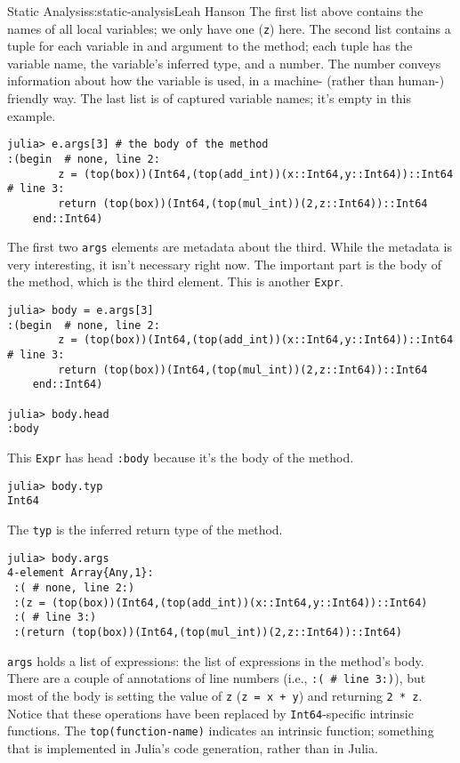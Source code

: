 \begin{aosachapter}{Static Analysis}{s:static-analysis}{Leah Hanson}
The first list above contains the names of all local variables; we only
have one (\texttt{z}) here. The second list contains a tuple for each
variable in and argument to the method; each tuple has the variable
name, the variable's inferred type, and a number. The number conveys
information about how the variable is used, in a machine- (rather than
human-) friendly way. The last list is of captured variable names; it's
empty in this example.

\begin{verbatim}
julia> e.args[3] # the body of the method
:(begin  # none, line 2:
        z = (top(box))(Int64,(top(add_int))(x::Int64,y::Int64))::Int64 # line 3:
        return (top(box))(Int64,(top(mul_int))(2,z::Int64))::Int64
    end::Int64)
\end{verbatim}

The first two \texttt{args} elements are metadata about the third. While
the metadata is very interesting, it isn't necessary right now. The
important part is the body of the method, which is the third element.
This is another \texttt{Expr}.

\begin{verbatim}
julia> body = e.args[3]
:(begin  # none, line 2:
        z = (top(box))(Int64,(top(add_int))(x::Int64,y::Int64))::Int64 # line 3:
        return (top(box))(Int64,(top(mul_int))(2,z::Int64))::Int64
    end::Int64)

julia> body.head
:body
\end{verbatim}

This \texttt{Expr} has head \texttt{:body} because it's the body of the
method.

\begin{verbatim}
julia> body.typ
Int64
\end{verbatim}

The \texttt{typ} is the inferred return type of the method.

\begin{verbatim}
julia> body.args
4-element Array{Any,1}:
 :( # none, line 2:)                                              
 :(z = (top(box))(Int64,(top(add_int))(x::Int64,y::Int64))::Int64)
 :( # line 3:)                                                    
 :(return (top(box))(Int64,(top(mul_int))(2,z::Int64))::Int64)    
\end{verbatim}

\texttt{args} holds a list of expressions: the list of expressions in
the method's body. There are a couple of annotations of line numbers
(i.e., \texttt{:( \# line 3:)}), but most of the body is setting the
value of \texttt{z} (\texttt{z = x + y}) and returning \texttt{2 * z}.
Notice that these operations have been replaced by
\texttt{Int64}-specific intrinsic functions. The
\texttt{top(function-name)} indicates an intrinsic function; something
that is implemented in Julia's code generation, rather than in Julia.


\end{aosachapter}
